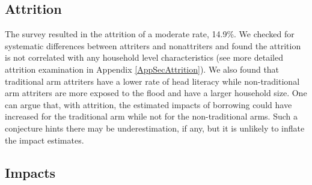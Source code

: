 \subsection{Attrition}
\label{SecAttrition}

	The survey resulted in the attrition of a moderate rate, 14.9\%. We checked for systematic differences between attriters and nonattriters 
	and found the attrition is not correlated with any household level characteristics (see more detailed attrition examination in Appendix \ref{AppSecAttrition}). %
	We also found that \textsf{traditional} arm attriters have a lower rate of head literacy while non-\textsf{traditional} arm attriters are more exposed to the flood and have a larger household size. One can argue that, with attrition, the estimated impacts of borrowing could have increased for the \textsf{traditional} arm while not for the non-\textsf{traditional} arms. Such a conjecture hints there may be underestimation, if any, but it is unlikely to inflate the impact estimates.

\subsection{Impacts}
\label{Sec Impacts}


